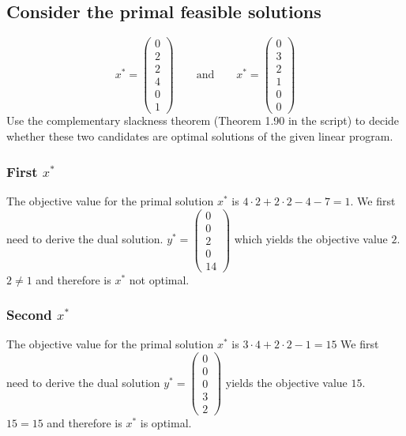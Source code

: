 \documentclass[12pt, a4]{article}
\begin{document}
\subsection{Consider the primal feasible solutions}
\begin{equation*}
	x^*=\begin{pmatrix}
		0 \\ 2 \\ 2 \\ 4 \\ 0 \\ 1
		\end{pmatrix}
	\quad\quad\text{and}\quad\quad
	x^*=\begin{pmatrix}
		0 \\ 3 \\ 2 \\ 1 \\ 0 \\ 0
	\end{pmatrix}
\end{equation*}
Use the complementary slackness theorem (Theorem 1.90 in the script) to decide whether these two candidates are optimal solutions of the given linear program.

\subsubsection{First $x^*$}
The objective value for the primal solution $x^*$ is $4\cdot2 + 2\cdot2 -4 - 7 = 1$.
We first need to derive the dual solution.
$y^* = \begin{pmatrix} 0 \\ 0 \\ 2 \\ 0 \\ 14 \end{pmatrix}$ which yields the objective value $2$. $2 \neq 1$ and therefore is $x^*$ not optimal.
\subsubsection{Second $x^*$}
The objective value for the primal solution $x^*$ is $3\cdot4 + 2\cdot2 - 1 = 15$
We first need to derive the dual solution
$y^* = \begin{pmatrix} 0 \\ 0 \\ 0 \\ 3 \\ 2 \end{pmatrix}$ yields the objective value $15$. $15 = 15$ and therefore is $x^*$ is optimal.
\end{document}

